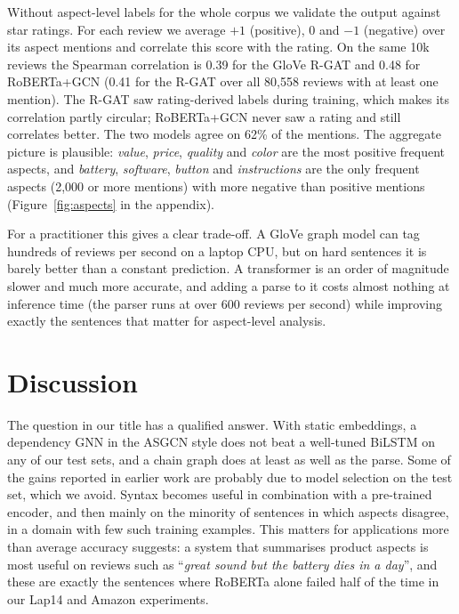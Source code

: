 \documentclass[11pt]{article}
\begin{document}
Without aspect-level labels for the whole corpus we validate the output against star ratings. For each review we average $+1$ (positive), $0$ and $-1$ (negative) over its aspect mentions and correlate this score with the rating. On the same 10k reviews the Spearman correlation is 0.39 for the GloVe R-GAT and 0.48 for RoBERTa+GCN (0.41 for the R-GAT over all 80,558 reviews with at least one mention). The R-GAT saw rating-derived labels during training, which makes its correlation partly circular; RoBERTa+GCN never saw a rating and still correlates better. The two models agree on 62\% of the mentions. The aggregate picture is plausible: \textit{value}, \textit{price}, \textit{quality} and \textit{color} are the most positive frequent aspects, and \textit{battery}, \textit{software}, \textit{button} and \textit{instructions} are the only frequent aspects (2,000 or more mentions) with more negative than positive mentions (Figure~\ref{fig:aspects} in the appendix).

For a practitioner this gives a clear trade-off. A GloVe graph model can tag hundreds of reviews per second on a laptop CPU, but on hard sentences it is barely better than a constant prediction. A transformer is an order of magnitude slower and much more accurate, and adding a parse to it costs almost nothing at inference time (the parser runs at over 600 reviews per second) while improving exactly the sentences that matter for aspect-level analysis.

\section{Discussion}

The question in our title has a qualified answer. With static embeddings, a dependency GNN in the ASGCN style does not beat a well-tuned BiLSTM on any of our test sets, and a chain graph does at least as well as the parse. Some of the gains reported in earlier work are probably due to model selection on the test set, which we avoid. Syntax becomes useful in combination with a pre-trained encoder, and then mainly on the minority of sentences in which aspects disagree, in a domain with few such training examples. This matters for applications more than average accuracy suggests: a system that summarises product aspects is most useful on reviews such as ``\textit{great sound but the battery dies in a day}'', and these are exactly the sentences where RoBERTa alone failed half of the time in our Lap14 and Amazon experiments.
\end{document}
